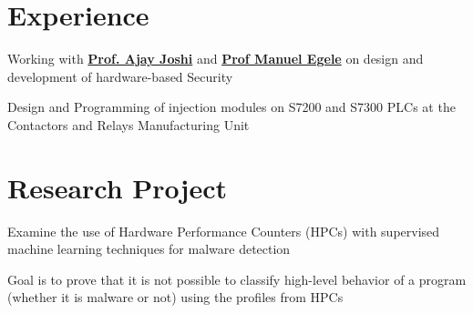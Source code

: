 \documentclass[]{deedy_format_Anmol}
\begin{document}
\hfill
\begin{minipage}[t]{0.66\textwidth} 
%
%



\section{Experience}
\vspace{0.5mm} %
\vspace{\topsep} %
\vspace{1mm}
\justify
\begin{tightemize}
\item Working with \textbf{\href{https://www.bu.edu/eng/profile/ajay-joshi/}{Prof. Ajay Joshi}} and \textbf{\href{https://www.bu.edu/eng/profile/manuel-egele/}{Prof Manuel Egele}} on design and development of hardware-based Security
\end{tightemize}
\vspace{\topsep}
\sectionsep

\vspace{1mm}
\justify
\begin{tightemize}
\item Design and Programming of injection modules on S7200 and S7300 PLCs at the Contactors and Relays Manufacturing Unit
\end{tightemize}
\vspace{\topsep}
\sectionsep


\section{Research Project}
\vspace{0.5mm} %
\vspace{1mm}
\justify
\begin{tightemize}
\item Examine the use of Hardware Performance Counters (HPCs) with supervised machine learning techniques for malware detection 
\item Goal is to prove that it is not possible to classify high-level behavior of a program (whether it is malware or not) using the profiles from HPCs
\end{tightemize}
\vspace{\topsep}
\sectionsep



\end{minipage}
\end{document}
